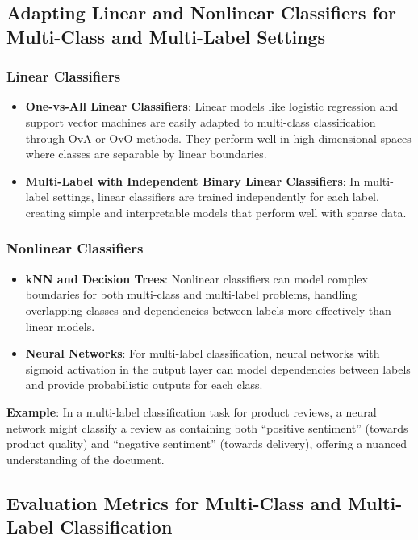 \documentclass{article}
\begin{document}
\subsection{Adapting Linear and Nonlinear Classifiers for Multi-Class and Multi-Label Settings}

\subsubsection*{Linear Classifiers}
\begin{itemize}
    \item \textbf{One-vs-All Linear Classifiers}: Linear models like logistic regression and support vector machines are easily adapted to multi-class classification through OvA or OvO methods. They perform well in high-dimensional spaces where classes are separable by linear boundaries.
    \item \textbf{Multi-Label with Independent Binary Linear Classifiers}: In multi-label settings, linear classifiers are trained independently for each label, creating simple and interpretable models that perform well with sparse data.
\end{itemize}

\subsubsection*{Nonlinear Classifiers}
\begin{itemize}
    \item \textbf{kNN and Decision Trees}: Nonlinear classifiers can model complex boundaries for both multi-class and multi-label problems, handling overlapping classes and dependencies between labels more effectively than linear models.
    \item \textbf{Neural Networks}: For multi-label classification, neural networks with sigmoid activation in the output layer can model dependencies between labels and provide probabilistic outputs for each class.
\end{itemize}

\textbf{Example}: In a multi-label classification task for product reviews, a neural network might classify a review as containing both “positive sentiment” (towards product quality) and “negative sentiment” (towards delivery), offering a nuanced understanding of the document.

\subsection{Evaluation Metrics for Multi-Class and Multi-Label Classification}
\end{document}
